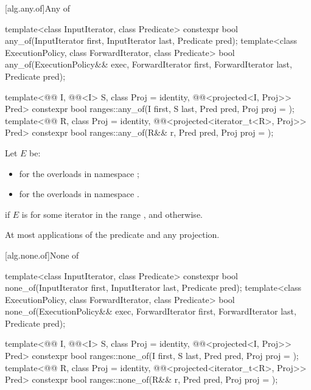 [alg.any.of]{Any of}

%
\begin{itemdecl}
template<class InputIterator, class Predicate>
  constexpr bool any_of(InputIterator first, InputIterator last, Predicate pred);
template<class ExecutionPolicy, class ForwardIterator, class Predicate>
  bool any_of(ExecutionPolicy&& exec, ForwardIterator first, ForwardIterator last,
              Predicate pred);

template<@@ I, @@<I> S, class Proj = identity,
         @@<projected<I, Proj>> Pred>
  constexpr bool ranges::any_of(I first, S last, Pred pred, Proj proj = {});
template<@@ R, class Proj = identity,
         @@<projected<iterator_t<R>, Proj>> Pred>
  constexpr bool ranges::any_of(R&& r, Pred pred, Proj proj = {});
\end{itemdecl}

\begin{itemdescr}
\pnum
Let $E$ be:
\begin{itemize}
\item
   for the overloads in namespace ;
\item
  for the overloads in namespace .
\end{itemize}

\pnum
\returns
{} if $E$ is  for some iterator 
in the range , and  otherwise.

\pnum
\complexity
At most  applications of the predicate
and any projection.
\end{itemdescr}

[alg.none.of]{None of}

%
\begin{itemdecl}
template<class InputIterator, class Predicate>
  constexpr bool none_of(InputIterator first, InputIterator last, Predicate pred);
template<class ExecutionPolicy, class ForwardIterator, class Predicate>
  bool none_of(ExecutionPolicy&& exec, ForwardIterator first, ForwardIterator last,
               Predicate pred);

template<@@ I, @@<I> S, class Proj = identity,
         @@<projected<I, Proj>> Pred>
  constexpr bool ranges::none_of(I first, S last, Pred pred, Proj proj = {});
template<@@ R, class Proj = identity,
         @@<projected<iterator_t<R>, Proj>> Pred>
  constexpr bool ranges::none_of(R&& r, Pred pred, Proj proj = {});
\end{itemdecl}

